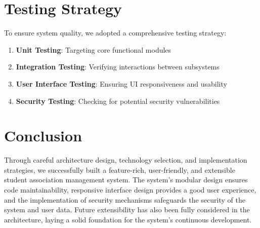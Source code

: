 \section{Testing Strategy}

To ensure system quality, we adopted a comprehensive testing strategy:

\begin{enumerate}
    \item \textbf{Unit Testing}: Targeting core functional modules
    \item \textbf{Integration Testing}: Verifying interactions between subsystems
    \item \textbf{User Interface Testing}: Ensuring UI responsiveness and usability
    \item \textbf{Security Testing}: Checking for potential security vulnerabilities
\end{enumerate}

\section{Conclusion}

Through careful architecture design, technology selection, and implementation strategies, we successfully built a feature-rich, user-friendly, and extensible student association management system. The system's modular design ensures code maintainability, responsive interface design provides a good user experience, and the implementation of security mechanisms safeguards the security of the system and user data. Future extensibility has also been fully considered in the architecture, laying a solid foundation for the system's continuous development.